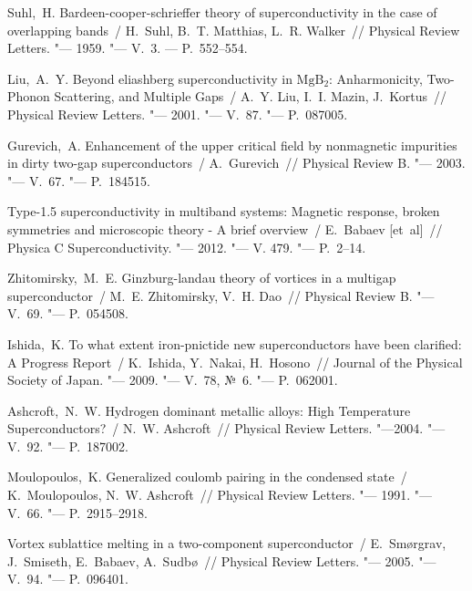 \renewcommand{\bibname}{СПИСОК ИСПОЛЬЗУЕМЫХ ИСТОЧНИКОВ}

\begin{thebibliography}{10}
     Suhl,~H. Bardeen-cooper-schrieffer theory of 
        superconductivity in the case of overlapping bands~/ H.~Suhl, 
        B.~T. Matthias, L.~R. Walker~// Physical Review Letters. "--- 
        1959. "--- V.~3. --- P.~552--554.

     Liu,~A.~Y. Beyond eliashberg superconductivity in 
        \( \mathrm{MgB_2} \): Anharmonicity, Two-Phonon Scattering, and 
        Multiple Gaps~/ A.~Y. Liu, I.~I. Mazin, J.~Kortus~// 
        Physical Review Letters. "--- 2001. "--- V.~87. "--- P.~087005.

     Gurevich,~A. Enhancement of the upper critical field by 
        nonmagnetic impurities in dirty two-gap superconductors~/ 
        A.~Gurevich~// Physical Review B. "--- 2003. "--- V.~67. "--- 
        P.~184515.

     Type-1.5 superconductivity in multiband systems: 
        Magnetic response, broken symmetries and microscopic theory - 
        A brief overview~/ E.~{Babaev} [et~al]~// 
        Physica C Superconductivity. "--- 2012. "--- V. 479. "--- 
        P.~2--14.

     Zhitomirsky,~M.~E. Ginzburg-landau theory of vortices in 
        a multigap superconductor~/ M.~E. Zhitomirsky, V.~H. Dao~// 
        Physical Review B. "--- V.~69. "--- P.~054508.

     Ishida,~K. To what extent iron-pnictide new 
        superconductors have been clarified: A Progress Report~/ 
        K.~Ishida, Y.~Nakai, H.~Hosono~// 
        Journal of the Physical Society of Japan. "--- 2009. "--- V.~78, 
        №~6. "--- P.~062001.

     Ashcroft,~N.~W. Hydrogen dominant metallic alloys: 
        High Temperature Superconductors?~/ N.~W. Ashcroft~// 
        Physical Review Letters. "---2004. "--- V.~92. "--- P.~187002.

     Moulopoulos,~K. Generalized coulomb pairing in the 
        condensed state~/ K.~Moulopoulos, N.~W. Ashcroft~// 
        Physical Review Letters. "--- 1991. "--- V.~66. "--- P.~2915--2918.

     Vortex sublattice melting in a two-component 
        superconductor~/ E.~Sm\o{}rgrav, J.~Smiseth, E.~Babaev, A.~Sudb\o{}~// 
        Physical Review Letters. "--- 2005. "--- V.~94. "--- P.~096401.


\end{thebibliography}
